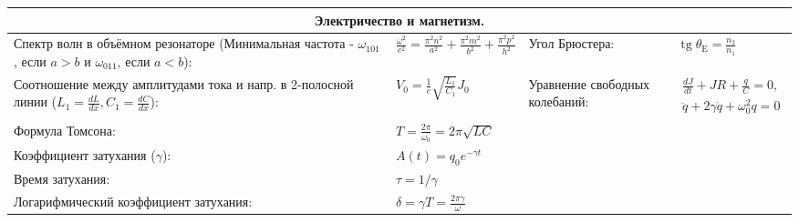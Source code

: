 \documentclass{article}
\begin{document}
\begin{tabular}{ |p{6cm}|p{3cm}|p{6cm}|p{3.5cm}|  }
\hline
\multicolumn{4}{|c|}{Электричество и магнетизм.} \\
\hline
Спектр волн в объёмном резонаторе (Минимальная частота - $\omega_{101}$, если $a > b$ и $\omega_{011}$, если $a < b$): &
$\frac{\omega^{2}}{c^{2}}=\frac{\pi^{2} n^{2}}{a^{2}}+\frac{\pi^{2} m^{2}}{b^{2}}+\frac{\pi^{2} p^{2}}{h^{2}}$ &
Угол Брюстера:                                                             &
$\operatorname{tg} \theta_{\mathrm{E}}=\frac{n_2}{n_1}$                    \\
\hline
Соотношение между амплитудами тока и напр. в 2-полосной линии ($L_1 = \frac{d{L}}{d{x}}, C_1 = \frac{d{C}}{d{x}}$): &
$V_{0}=\frac{1}{c} \sqrt{\frac{L_{1}}{C_{1}}} J_{0}$                       &
Уравнение свободных колебаний:                                             &
$\begin{aligned}
 \frac{d J}{d t}+J R+\frac{q}{C}=0,\\
\ddot{q}+2 \gamma \dot{q}+\omega_{0}^{2} q=0
\end{aligned}$                                                             \\
\hline
Формула Томсона:                                                           &
$T=\frac{2 \pi}{\omega_{0}}=2 \pi \sqrt{L C}$                              &
                                                                           &
                                                                           \\
\hline
Коэффициент затухания ($\gamma$):                                          &
$A(t)=q_{0} e^{-\gamma t}$                                                 &
                                                                           &
                                                                           \\
\hline
Время затухания:                                                           &
$\tau=1 / \gamma$                                                          &
                                                                           &
                                                                           \\
\hline
Логарифмический коэффициент затухания:                                     &
$\delta=\gamma T=\frac{2 \pi \gamma}{\omega}$                              &
                                                                           &
                                                                           \\

\end{tabular}
\end{document}
